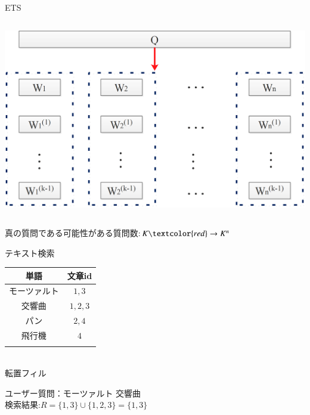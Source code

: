 \documentclass[14pt,xcolor=dvipsnames,table,dvipdfmx]{beamer}
\begin{document}
\begin{frame}{ETS}
	\begin{columns}[t]
		\begin{column}{0.8\textwidth} %
			\includegraphics[width=\columnwidth]{rk8.png}
		\end{column}
	\end{columns}
	\begin{block}{}
		真の質問である可能性がある質問数:$K \textcolor{red}\rightarrow K^n$	
	\end{block}
\end{frame}

\begin{frame}{テキスト検索}
\fontsize{12pt}{7.2}\selectfont
		\center
		\begin{tabular}{|c|c|}
		\noalign{\hrule height 1pt}
		単語 & 文章id \\
		\hline
		モーツァルト & $1,3$\\
		交響曲 & $1,2,3$ \\
		パン & $2,4$ \\
		飛行機 & $4$ \\
		\noalign{\hrule height 1pt}
		\end{tabular}\\
		\center
		転置フィル
	\begin{block}{}
	ユーザー質問：モーツァルト 交響曲 \\
	検索結果:$R = \{1,3\} \cup \{1,2,3\} = \{1,3\}$
	\end{block}
\end{frame}
\end{document}
